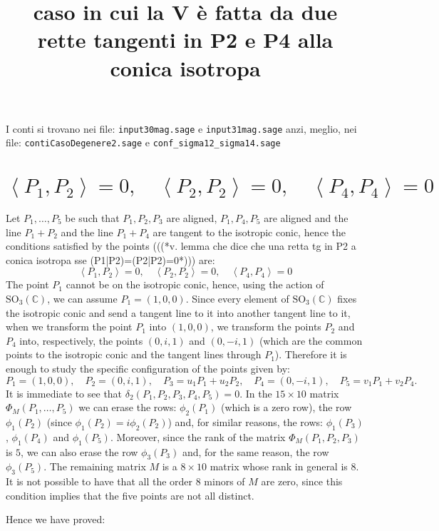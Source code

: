 \documentclass[10pt, a4paper, reqno, captions=tableheading,bibliography=totoc]{scrartcl}
\title{caso in cui la V \`e fatta da due rette tangenti in P2 e P4
alla conica isotropa}
\author{}
\date{}
\theoremstyle{plain}
\theoremstyle{definition}
\newcommand{\scl}[2]{\left\langle {#1}, {#2} \right\rangle}
\begin{document}
\maketitle

I conti si trovano nei file:
\verb+input30mag.sage+ e \verb+input31mag.sage+
anzi, meglio, nei file:
\verb+contiCasoDegenere2.sage+ e \verb+conf_sigma12_sigma14.sage+


\section{$\scl{P_1}{P_2}=0, \quad \scl{P_2}{P_2}=0, \quad \scl{P_4}{P_4}=0$}
\label{sez2tgA}

Let $P_1, \dots, P_5$ be such that $P_1, P_2, P_3$ are aligned,
$P_1, P_4, P_5$ are aligned and the line $P_1+P_2$ and the line
$P_1+P_4$ are tangent to the isotropic conic, hence
the conditions satisfied by the points (((*v. lemma che dice che
una retta tg in P2 a conica isotropa sse (P1|P2)=(P2|P2)=0*))) are:
\[
\scl{P_1}{P_2}=0, \quad \scl{P_2}{P_2}=0, \quad \scl{P_4}{P_4}=0
\]
The point $P_1$ cannot be on the isotropic conic, hence, using the
action of $\mathrm{SO}_3(\mathbb{C})$, we can assume $P_1 = (1, 0, 0)$.
Since every element of $\mathrm{SO}_3(\mathbb{C})$ fixes the
isotropic conic and send a tangent line to it into another 
tangent line to it, when we transform the point $P_1$
into $(1, 0, 0)$, we transform the points $P_2$ and $P_4$ into, respectively,
the points $(0, i, 1)$ and $(0, -i, 1)$ (which are the common points to
the isotropic conic and the tangent lines through $P_1$).
Therefore it is enough to study the
specific configuration of the points given by:
\[
P_1 = (1, 0, 0), \quad P_2=(0, i, 1), \quad P_3=u_1P_1+u_2P_2, \quad
P_4= (0, -i, 1), \quad P_5 = v_1P_1+v_2P_4.
\]
It is immediate to see that $\delta_2(P_1, P_2, P_3, P_4, P_5) = 0$.
In the $15\times 10$ matrix $\Phi_M(P_1, \dots, P_5)$ we can erase the
rows: $\phi_2(P_1)$ (which is a zero row), the row $\phi_1(P_2)$
(since $\phi_1(P_2)=i\phi_2(P_2)$) and, for similar reasons, the
rows: $\phi_1(P_3)$, $\phi_1(P_4)$ and $\phi_1(P_5)$. 
Moreover, since the rank of the matrix $\Phi_M(P_1, P_2, P_3)$ is $5$,
we can also erase the row $\phi_3(P_3)$ and, for the same reason, the
row $\phi_3(P_5)$. The remaining matrix $M$ is a $8\times 10$ matrix whose rank
in general is $8$. It is not possible to have that all the order $8$ minors
of $M$ are zero, since this condition implies that the five points
are not all distinct.

Hence we have proved:
\end{document}
